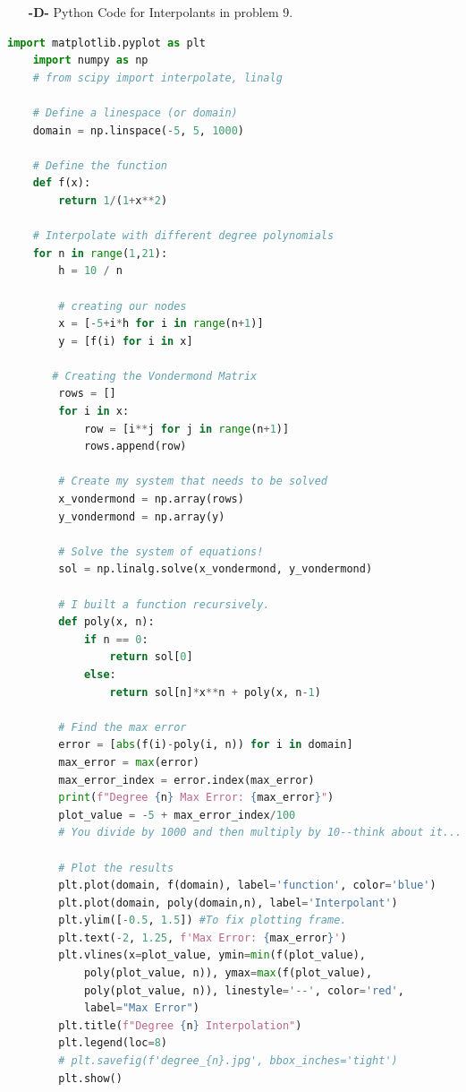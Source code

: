 \documentclass[11pt]{article}
\theoremstyle{definition}
\newcommand{\1}[1]{\mathbf{1} \left \{ #1 \right \}}
\begin{document}
\begin{itemize}
    \item[{\textbf{-D-}}] Python Code for Interpolants in problem 9.
\end{itemize}
\begin{lstlisting}[language=Python]
    import matplotlib.pyplot as plt
    import numpy as np
    # from scipy import interpolate, linalg

    # Define a linespace (or domain)
    domain = np.linspace(-5, 5, 1000)

    # Define the function
    def f(x):
        return 1/(1+x**2)

    # Interpolate with different degree polynomials
    for n in range(1,21):
        h = 10 / n

        # creating our nodes
        x = [-5+i*h for i in range(n+1)]
        y = [f(i) for i in x]

       # Creating the Vondermond Matrix
        rows = []
        for i in x:
            row = [i**j for j in range(n+1)]
            rows.append(row)

        # Create my system that needs to be solved
        x_vondermond = np.array(rows)
        y_vondermond = np.array(y)

        # Solve the system of equations!
        sol = np.linalg.solve(x_vondermond, y_vondermond)

        # I built a function recursively.
        def poly(x, n):
            if n == 0:
                return sol[0]
            else:
                return sol[n]*x**n + poly(x, n-1)

        # Find the max error
        error = [abs(f(i)-poly(i, n)) for i in domain]
        max_error = max(error)
        max_error_index = error.index(max_error)
        print(f"Degree {n} Max Error: {max_error}")
        plot_value = -5 + max_error_index/100
        # You divide by 1000 and then multiply by 10--think about it...

        # Plot the results
        plt.plot(domain, f(domain), label='function', color='blue')
        plt.plot(domain, poly(domain,n), label='Interpolant')
        plt.ylim([-0.5, 1.5]) #To fix plotting frame.
        plt.text(-2, 1.25, f'Max Error: {max_error}')
        plt.vlines(x=plot_value, ymin=min(f(plot_value),
            poly(plot_value, n)), ymax=max(f(plot_value),
            poly(plot_value, n)), linestyle='--', color='red',
            label="Max Error")
        plt.title(f"Degree {n} Interpolation")
        plt.legend(loc=8)
        # plt.savefig(f'degree_{n}.jpg', bbox_inches='tight')
        plt.show()
\end{lstlisting}
\end{document}

